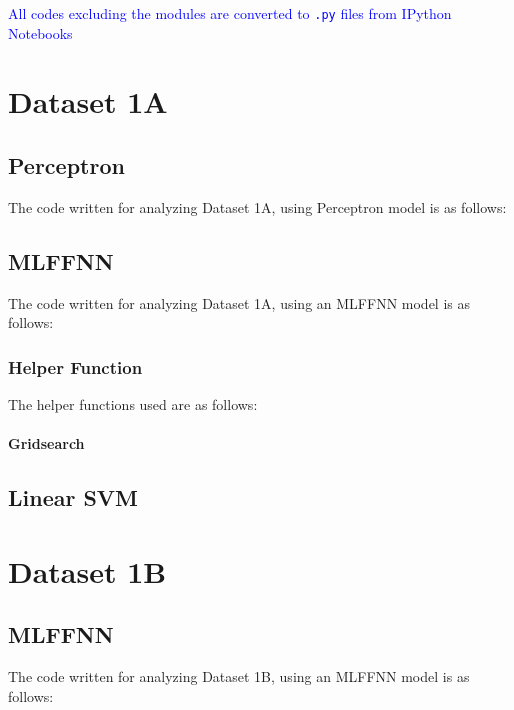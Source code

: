 \documentclass[11pt,a4paper]{article}
\newcommand{\noi}{\noindent}
\def\tt#1{\texttt{#1}}
\begin{document}
{\hypersetup{linkcolor=black}
 \tableofcontents}
\break

\noi
\textcolor{blue}{All codes excluding the modules are converted to \tt{.py} files from IPython Notebooks}

\section{Dataset 1A}
\subsection{Perceptron}
The code written for analyzing Dataset 1A, using Perceptron model is as follows:\vspace{-1em}


\subsection{MLFFNN}
The code written for analyzing Dataset 1A, using an MLFFNN model is as follows:\vspace{-1em}


\subsubsection{Helper Function}
The helper functions used are as follows:\vspace{-1em}
\paragraph{Gridsearch}



\subsection{Linear SVM}

\section{Dataset 1B}
\subsection{MLFFNN}
The code written for analyzing Dataset 1B, using an MLFFNN model is as follows:\vspace{-1em}

\end{document}

